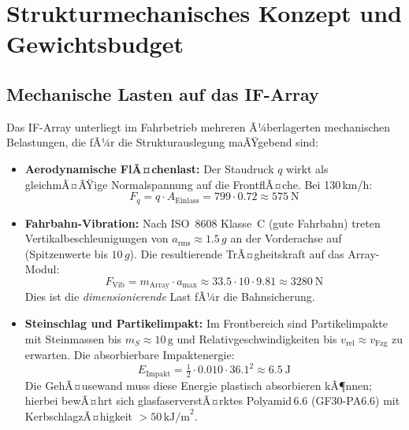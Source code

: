 ﻿\documentclass[12pt, a4paper]{report}
\theoremstyle{definition}
\theoremstyle{remark}
\newcommand{\Aeinlass}{A_{\text{Einlass}}}
\begin{document}
\section{Strukturmechanisches Konzept und Gewichtsbudget}
\label{sec:kfz_struktur}

\subsection{Mechanische Lasten auf das IF-Array}

Das IF-Array unterliegt im Fahrbetrieb mehreren Ã¼berlagerten mechanischen
Belastungen, die fÃ¼r die Strukturauslegung maÃŸgebend sind:

\begin{itemize}
  \item \textbf{Aerodynamische FlÃ¤chenlast:} Der Staudruck $q$ wirkt als
        gleichmÃ¤ÃŸige Normalspannung auf die FrontflÃ¤che. Bei 130\,km/h:
        \begin{equation}
          F_q = q \cdot \Aeinlass = 799 \cdot 0.72 \approx \SI{575}{\newton}
          \label{eq:f_stau}
        \end{equation}

  \item \textbf{Fahrbahn-Vibration:} Nach ISO~8608 Klasse~C (gute Fahrbahn)
        treten Vertikalbeschleunigungen von $a_{\text{rms}} \approx 1.5\,g$
        an der Vorderachse auf (Spitzenwerte bis $10\,g$). Die resultierende
        TrÃ¤gheitskraft auf das Array-Modul:
        \begin{equation}
          F_{\text{Vib}} = m_{\text{Array}} \cdot a_{\text{max}}
          \approx 33.5 \cdot 10 \cdot 9.81 \approx \SI{3280}{\newton}
          \label{eq:f_vib}
        \end{equation}
        Dies ist die \emph{dimensionierende} Last fÃ¼r die Bahnsicherung.

  \item \textbf{Steinschlag und Partikelimpakt:} Im Frontbereich sind
        Partikelimpakte mit Steinmassen bis $m_S \approx 10\,\text{g}$ und
        Relativgeschwindigkeiten bis $v_{\text{rel}} \approx v_{\text{Fzg}}$
        zu erwarten. Die absorbierbare Impaktenergie:
        \begin{equation}
          E_{\text{Impakt}} = \tfrac{1}{2} \cdot 0.010 \cdot 36.1^2
          \approx \SI{6.5}{\joule}
          \label{eq:e_impakt}
        \end{equation}
        Die GehÃ¤usewand muss diese Energie plastisch absorbieren kÃ¶nnen;
        hierbei bewÃ¤hrt sich glasfaserverstÃ¤rktes Polyamid\,6.6 (GF30-PA6.6)
        mit KerbschlagzÃ¤higkeit $> 50\,\text{kJ/m}^2$.
\end{itemize}
\end{document}

